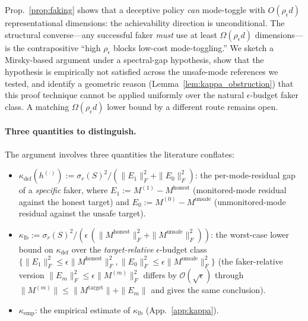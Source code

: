 \documentclass[10pt]{article}
\theoremstyle{definition}
\theoremstyle{remark}
\begin{document}
Prop.~\ref{prop:faking} shows that a deceptive policy
\emph{can} mode-toggle with $O(\rho_{\epsilon}d)$
representational dimensions: the achievability direction
is unconditional.  The structural converse---any
successful faker \emph{must} use at least
$\Omega(\rho_{\epsilon}d)$ dimensions---is the
contrapositive ``high $\rho_{\epsilon}$ blocks low-cost
mode-toggling.''  We
sketch a Mirsky-based argument under a spectral-gap
hypothesis, show that the hypothesis is empirically
not satisfied across the unsafe-mode references we
tested, and identify a geometric reason
(Lemma~\ref{lem:kappa_obstruction}) that this proof
technique cannot be applied uniformly over the natural
$\epsilon$-budget faker class.  A matching
$\Omega(\rho_{\epsilon}d)$ lower bound by a different
route remains open.

\paragraph{Three quantities to distinguish.}
The argument involves three quantities the literature
conflates:
\begin{itemize}[nosep]
  \item $\kappa_{\mathrm{def}}(h^{(\cdot)}) :=
        \sigma_r(S)^2 / (\|E_1\|_F^2 + \|E_0\|_F^2)$:
        the per-mode-residual gap of a \emph{specific}
        faker, where $E_1 := M^{(1)} - M^{\mathrm{honest}}$
        (monitored-mode residual against the honest
        target) and
        $E_0 := M^{(0)} - M^{\mathrm{unsafe}}$
        (unmonitored-mode residual against the unsafe
        target).
  \item $\kappa_{\mathrm{lb}} :=
        \sigma_r(S)^2 / (\epsilon\,(\|M^{\mathrm{honest}}\|_F^2 +
        \|M^{\mathrm{unsafe}}\|_F^2))$:
        the worst-case lower bound on
        $\kappa_{\mathrm{def}}$ over the
        \emph{target-relative} $\epsilon$-budget class
        $\{\|E_1\|_F^2 \leq \epsilon\|M^{\mathrm{honest}}\|_F^2,
        \|E_0\|_F^2 \leq \epsilon\|M^{\mathrm{unsafe}}\|_F^2\}$
        (the faker-relative version
        $\|E_m\|_F^2 \leq \epsilon\|M^{(m)}\|_F^2$ differs
        by $\mathcal{O}(\sqrt{\epsilon})$ through
        $\|M^{(m)}\| \leq \|M^{\mathrm{target}}\| + \|E_m\|$
        and gives the same conclusion).
  \item $\kappa_{\mathrm{emp}}$: the empirical estimate
        of $\kappa_{\mathrm{lb}}$ (App.~\ref{app:kappa}).
\end{itemize}
\end{document}
